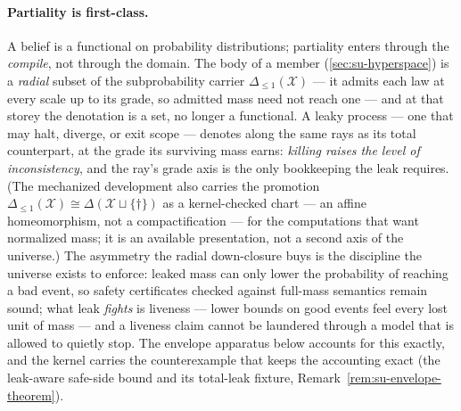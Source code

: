 \paragraph{Partiality is first-class.} A belief is a functional on
probability distributions; partiality enters through the \emph{compile}, not
through the domain. The body of a member (\autoref{sec:su-hyperspace}) is a
\emph{radial} subset of the subprobability carrier
$\Delta_{\le 1}(\mathcal{X})$ --- it admits each law at every scale up to its
grade, so admitted mass need not reach one --- and at that storey the
denotation is a set, no longer a functional. A leaky process --- one that may
halt, diverge, or exit scope --- denotes along the same rays as its total
counterpart, at the grade its surviving mass earns: \emph{killing raises the
level of inconsistency}, and the ray's grade axis is the only bookkeeping the
leak requires.
(The mechanized development also carries the promotion
$\Delta_{\le 1}(\mathcal{X}) \cong \Delta(\mathcal{X} \sqcup \{\dagger\})$ as
a kernel-checked chart --- an affine homeomorphism, not a compactification
--- for the computations that want normalized mass; it is an available
presentation, not a second axis of the universe.) The asymmetry the radial
down-closure buys is the discipline the universe exists to enforce: leaked
mass can only lower the probability of reaching a bad event, so safety
certificates checked against full-mass semantics remain sound; what leak
\emph{fights} is liveness --- lower bounds on good events feel every lost
unit of mass --- and a liveness claim cannot be laundered through a model
that is allowed to quietly stop. The envelope apparatus below accounts for
this exactly, and the kernel carries the counterexample that keeps the
accounting exact (the leak-aware safe-side bound and its total-leak fixture,
Remark~\ref{rem:su-envelope-theorem}).

